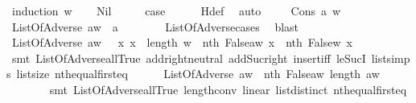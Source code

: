 \begin{isabellebody}
%
\isadelimproof
%
\endisadelimproof
%
\isatagproof
{}\isamarkupfalse%
\ {\isacharparenleft}induction\ w{\isacharparenright}\isanewline
\ \ \isamarkupfalse%
\ Nil\isanewline
\ \ \isamarkupfalse%
\ \isamarkupfalse%
\ {\isacharquery}case\isanewline
\ \ \ \ \isamarkupfalse%
\ H{\isacharunderscore}def\ \isamarkupfalse%
\ auto\ \isanewline
{}\isamarkupfalse%
\isanewline
\ \ \isamarkupfalse%
\ {\isacharparenleft}Cons\ a\ w{\isacharparenright}\isanewline
\ \ \ \ \isamarkupfalse%
\ {\isachardoublequoteopen}ListOfAdverse\ {\isacharparenleft}a{\isacharhash}w{\isacharparenright}\ {\isasymlongrightarrow}\ a{\isachardoublequoteclose}\isanewline
\ \ \ \ \ \ \isamarkupfalse%
\ ListOfAdverse{\isachardot}cases\ \isamarkupfalse%
\ blast\isanewline
\ \ \ \ \isamarkupfalse%
\ \isamarkupfalse%
\ {\isachardoublequoteopen}ListOfAdverse\ {\isacharparenleft}a{\isacharhash}w{\isacharparenright}\ {\isasymlongrightarrow}\ {\isacharparenleft}{\isasymforall}\ x{\isachardot}\ x\ {\isasymle}\ length\ w\ {\isasymlongrightarrow}\ nth\ {\isacharparenleft}False{\isacharhash}{\isacharparenleft}a{\isacharhash}w{\isacharparenright}{\isacharparenright}\ x\ {\isacharequal}\ nth\ {\isacharparenleft}False{\isacharhash}w{\isacharparenright}\ x{\isacharparenright}{\isachardoublequoteclose}\isanewline
\ \ \ \ \ \ \isamarkupfalse%
\ {\isacharparenleft}smt\ ListOfAdverse{\isacharunderscore}all{\isacharunderscore}True\ add{\isachardot}right{\isacharunderscore}neutral\ add{\isacharunderscore}Suc{\isacharunderscore}right\ insert{\isacharunderscore}iff\ le{\isacharunderscore}SucI\ list{\isachardot}simps{\isacharparenleft}{}{}{\isacharparenright}\ list{\isachardot}size{\isacharparenleft}{}{\isacharparenright}\ nth{\isacharunderscore}equal{\isacharunderscore}first{\isacharunderscore}eq{\isacharparenright}\isanewline
\ \ \ \ \isamarkupfalse%
\ {\isachardoublequoteopen}ListOfAdverse\ {\isacharparenleft}a{\isacharhash}w{\isacharparenright}\ {\isasymlongrightarrow}\ {\isacharparenleft}nth\ {\isacharparenleft}False{\isacharhash}{\isacharparenleft}a{\isacharhash}w{\isacharparenright}{\isacharparenright}\ {\isacharparenleft}length\ {\isacharparenleft}a{\isacharhash}w{\isacharparenright}{\isacharparenright}{\isacharparenright}{\isachardoublequoteclose}\isanewline
\ \ \ \ \ \ \isamarkupfalse%
\ {\isacharparenleft}smt\ ListOfAdverse{\isacharunderscore}all{\isacharunderscore}True\ length{\isacharunderscore}{}{\isacharunderscore}conv\ linear\ list{\isachardot}distinct{\isacharparenleft}{}{\isacharparenright}\ nth{\isacharunderscore}equal{\isacharunderscore}first{\isacharunderscore}eq{\isacharparenright}\isanewline

\end{isabellebody}
